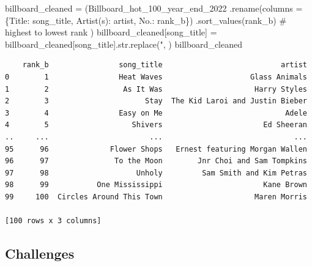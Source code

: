 \documentclass[
  letterpaper,
  DIV=11,
  numbers=noendperiod]{scrreprt}
\newenvironment{Shaded}{\begin{snugshade}}{\end{snugshade}}
\newcommand{\BuiltInTok}[1]{\textcolor[rgb]{0.00,0.23,0.31}{#1}}
\newcommand{\CommentTok}[1]{\textcolor[rgb]{0.37,0.37,0.37}{#1}}
\newcommand{\NormalTok}[1]{\textcolor[rgb]{0.00,0.23,0.31}{#1}}
\newcommand{\OperatorTok}[1]{\textcolor[rgb]{0.37,0.37,0.37}{#1}}
\newcommand{\StringTok}[1]{\textcolor[rgb]{0.13,0.47,0.30}{#1}}
\begin{document}
\begin{Shaded}
\begin{Highlighting}[]
\NormalTok{billboard\_cleaned }\OperatorTok{=}\NormalTok{ (Billboard\_hot\_100\_year\_end\_2022}
\NormalTok{                   .rename(columns }\OperatorTok{=}\NormalTok{ \{}\StringTok{\textquotesingle{}Title\textquotesingle{}}\NormalTok{: }\StringTok{\textquotesingle{}song\_title\textquotesingle{}}\NormalTok{,}
                                      \StringTok{\textquotesingle{}Artist(s)\textquotesingle{}}\NormalTok{: }\StringTok{\textquotesingle{}artist\textquotesingle{}}\NormalTok{,}
                                      \StringTok{\textquotesingle{}No.\textquotesingle{}}\NormalTok{: }\StringTok{\textquotesingle{}rank\_b\textquotesingle{}}\NormalTok{\})}
\NormalTok{                   .sort\_values(}\StringTok{\textquotesingle{}rank\_b\textquotesingle{}}\NormalTok{) }\CommentTok{\# highest to lowest rank}
\NormalTok{                  )}
\NormalTok{billboard\_cleaned[}\StringTok{\textquotesingle{}song\_title\textquotesingle{}}\NormalTok{] }\OperatorTok{=}\NormalTok{ billboard\_cleaned[}\StringTok{\textquotesingle{}song\_title\textquotesingle{}}\NormalTok{].}\BuiltInTok{str}\NormalTok{.replace(}\StringTok{\textquotesingle{}"\textquotesingle{}}\NormalTok{, }\StringTok{\textquotesingle{}\textquotesingle{}}\NormalTok{)}
\NormalTok{billboard\_cleaned}
\end{Highlighting}
\end{Shaded}

\begin{verbatim}
    rank_b                song_title                           artist
0        1                Heat Waves                    Glass Animals
1        2                 As It Was                     Harry Styles
2        3                      Stay  The Kid Laroi and Justin Bieber
3        4                Easy on Me                            Adele
4        5                   Shivers                       Ed Sheeran
..     ...                       ...                              ...
95      96              Flower Shops   Ernest featuring Morgan Wallen
96      97               To the Moon        Jnr Choi and Sam Tompkins
97      98                    Unholy         Sam Smith and Kim Petras
98      99           One Mississippi                       Kane Brown
99     100  Circles Around This Town                     Maren Morris

[100 rows x 3 columns]
\end{verbatim}

\subsection*{Challenges}\label{challenges}
\end{document}
